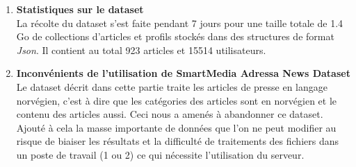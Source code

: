 \begin{enumerate}[leftmargin=*]
        \item\textbf{Statistiques sur le dataset}\\
        La récolte du dataset s'est faite pendant 7 jours pour une taille totale de 1.4 Go de collections d'articles et profils stockés dans des structures de format \emph{Json}. Il contient au total 923 articles et 15514 utilisateurs.\\

        \item\textbf{Inconvénients de l'utilisation de \textquotedbl SmartMedia Adressa News Dataset\textquotedbl}\\
        Le dataset décrit dans cette partie traite les articles de presse en langage norvégien, c'est à dire que les catégories des articles sont en norvégien et le contenu des articles aussi. Ceci nous a amenés à abandonner ce dataset. Ajouté à cela la masse importante de données que l'on ne peut modifier au risque de biaiser les résultats et la difficulté de traitements des fichiers dans un poste de travail (1 ou 2) ce qui nécessite l'utilisation du serveur.\\
    \end{enumerate}

